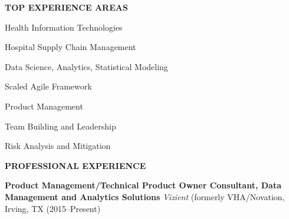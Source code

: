\documentclass{article}
\newcommand{\sbt}{\,\begin{picture}(-1,1)(-1,-3)\circle*{3}\end{picture}\ }
\newenvironment{tightcenter}{%
  \setlength\topsep{0pt}
  \setlength\parskip{10pt}
  \begin{center}
}{%
  \end{center}
}
\begin{document}
\begin{tightcenter}
{\bfseries \large TOP EXPERIENCE AREAS}
\end{tightcenter}

\begin{minipage}[t]{0.5\textwidth}
\begin{compactitem}
\item[\sbt] Health Information Technologies
\item[\sbt] Hospital Supply Chain Management
\item[\sbt] Data Science, Analytics, Statistical Modeling
\item[\sbt] Scaled Agile Framework
\end{compactitem}
\end{minipage}
\begin{minipage}[t]{0.5\textwidth}
\begin{compactitem}
\item[\sbt] Product Management
\item[\sbt] Team Building and Leadership
\item[\sbt] Risk Analysis and Mitigation

\end{compactitem}
\end{minipage}

\begin{tightcenter}
{\bfseries \large PROFESSIONAL EXPERIENCE}
\end{tightcenter}

\noindent
{\bfseries Product Management/Technical Product Owner Consultant, Data Management and Analytics Solutions} {\itshape Vizient} (formerly VHA/Novation, Irving, TX (2015--Present)
\end{document}

